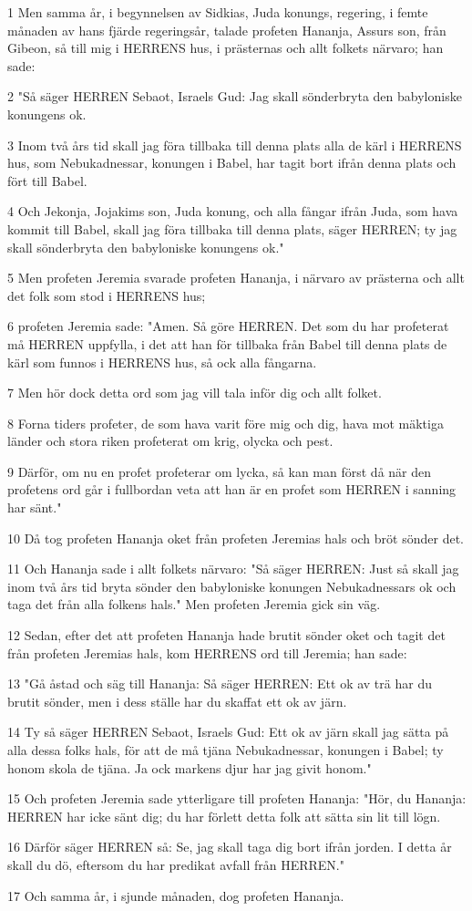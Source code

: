\par 1 Men samma år, i begynnelsen av Sidkias, Juda konungs, regering, i femte månaden av hans fjärde regeringsår, talade profeten Hananja, Assurs son, från Gibeon, så till mig i HERRENS hus, i prästernas och allt folkets närvaro; han sade:
\par 2 "Så säger HERREN Sebaot, Israels Gud: Jag skall sönderbryta den babyloniske konungens ok.
\par 3 Inom två års tid skall jag föra tillbaka till denna plats alla de kärl i HERRENS hus, som Nebukadnessar, konungen i Babel, har tagit bort ifrån denna plats och fört till Babel.
\par 4 Och Jekonja, Jojakims son, Juda konung, och alla fångar ifrån Juda, som hava kommit till Babel, skall jag föra tillbaka till denna plats, säger HERREN; ty jag skall sönderbryta den babyloniske konungens ok."
\par 5 Men profeten Jeremia svarade profeten Hananja, i närvaro av prästerna och allt det folk som stod i HERRENS hus;
\par 6 profeten Jeremia sade: "Amen. Så göre HERREN. Det som du har profeterat må HERREN uppfylla, i det att han för tillbaka från Babel till denna plats de kärl som funnos i HERRENS hus, så ock alla fångarna.
\par 7 Men hör dock detta ord som jag vill tala inför dig och allt folket.
\par 8 Forna tiders profeter, de som hava varit före mig och dig, hava mot mäktiga länder och stora riken profeterat om krig, olycka och pest.
\par 9 Därför, om nu en profet profeterar om lycka, så kan man först då när den profetens ord går i fullbordan veta att han är en profet som HERREN i sanning har sänt."
\par 10 Då tog profeten Hananja oket från profeten Jeremias hals och bröt sönder det.
\par 11 Och Hananja sade i allt folkets närvaro: "Så säger HERREN: Just så skall jag inom två års tid bryta sönder den babyloniske konungen Nebukadnessars ok och taga det från alla folkens hals." Men profeten Jeremia gick sin väg.
\par 12 Sedan, efter det att profeten Hananja hade brutit sönder oket och tagit det från profeten Jeremias hals, kom HERRENS ord till Jeremia; han sade:
\par 13 "Gå åstad och säg till Hananja: Så säger HERREN: Ett ok av trä har du brutit sönder, men i dess ställe har du skaffat ett ok av järn.
\par 14 Ty så säger HERREN Sebaot, Israels Gud: Ett ok av järn skall jag sätta på alla dessa folks hals, för att de må tjäna Nebukadnessar, konungen i Babel; ty honom skola de tjäna. Ja ock markens djur har jag givit honom."
\par 15 Och profeten Jeremia sade ytterligare till profeten Hananja: "Hör, du Hananja: HERREN har icke sänt dig; du har förlett detta folk att sätta sin lit till lögn.
\par 16 Därför säger HERREN så: Se, jag skall taga dig bort ifrån jorden. I detta år skall du dö, eftersom du har predikat avfall från HERREN."
\par 17 Och samma år, i sjunde månaden, dog profeten Hananja.

